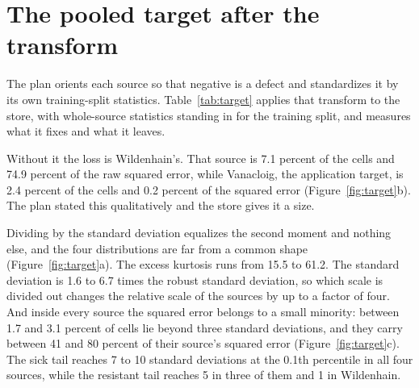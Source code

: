 
\section{The pooled target after the transform}
\label{sec:target}

The plan orients each source so that negative is a defect and standardizes it by its own
training-split statistics. Table~\ref{tab:target} applies that transform to the store,
with whole-source statistics standing in for the training split, and measures what it
fixes and what it leaves.

\begin{table}[htbp]
\centering
\footnotesize
\caption{The pooled target per source. $o$ is the orientation factor. Raw squared error
is the source's share of the pool's squared deviation from each source's own mean, before
any standardizing. The $z$ columns are quantiles of the oriented, standardized response.
Robust sd is 1.4826 times the median absolute deviation.}
\label{tab:target}

\end{table}

Without it the loss is Wildenhain's. That source is 7.1 percent of the cells and 74.9
percent of the raw squared error, while Vanacloig, the application target, is 2.4 percent
of the cells and 0.2 percent of the squared error (Figure~\ref{fig:target}b). The plan
stated this qualitatively and the store gives it a size.

Dividing by the standard deviation equalizes the second moment and nothing else, and the
four distributions are far from a common shape (Figure~\ref{fig:target}a). The excess
kurtosis runs from 15.5 to 61.2. The standard deviation is 1.6 to 6.7 times the robust
standard deviation, so which scale is divided out changes the relative scale of the
sources by up to a factor of four. And inside every source the squared error belongs to a small
minority: between 1.7 and 3.1 percent of cells lie beyond three standard deviations, and
they carry between 41 and 80 percent of their source's squared error
(Figure~\ref{fig:target}c). The sick tail reaches 7 to 10 standard deviations at the
0.1th percentile in all four sources, while the resistant tail reaches 5 in three of them
and 1 in Wildenhain.

